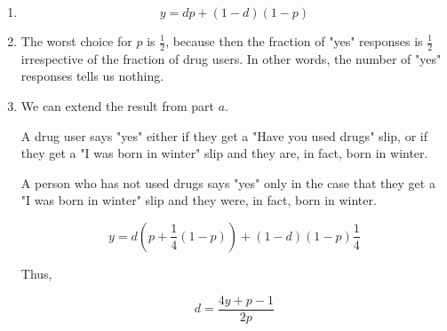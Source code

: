 \begin{enumerate}[label=(\alph*)]
\item $$y = dp + (1-d)(1-p)$$

\item The worst choice for $p$ is $\frac{1}{2}$, because then the fraction of
"yes" responses is $\frac{1}{2}$ irrespective of the fraction of drug users. In
other words, the number of "yes" responses tells us nothing.

\item We can extend the result from part $a$. 

A drug user says "yes" either if they get a "Have you used drugs" slip, or
if they get a "I was born in winter" slip and they are, in fact, born in winter.

A person who has not used drugs says "yes" only in the case that
they get a "I was born in winter" slip and they were, in fact,
born in winter.

$$y = d(p + \frac{1}{4}(1-p)) + (1-d)(1-p)\frac{1}{4}$$

Thus,

$$d = \frac{4y + p - 1}{2p}$$

\end{enumerate}